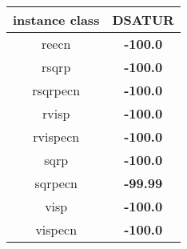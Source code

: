 \begin{tabular}{c|c}
instance class & DSATUR \\ 
\hline
reecn        & {\bf -100.0} \\ 
rsqrp        & {\bf -100.0} \\ 
rsqrpecn     & {\bf -100.0} \\ 
rvisp        & {\bf -100.0} \\ 
rvispecn     & {\bf -100.0} \\ 
sqrp         & {\bf -100.0} \\ 
sqrpecn      & {\bf -99.99} \\ 
visp         & {\bf -100.0} \\ 
vispecn      & {\bf -100.0} \\ 
\end{tabular}